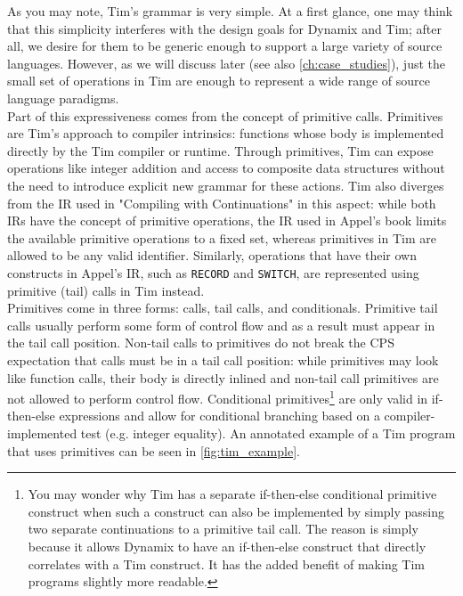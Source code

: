 As you may note, Tim's grammar is very simple. At a first glance, one may think that this simplicity interferes with the design goals for Dynamix and Tim; after all, we desire for them to be generic enough to support a large variety of source languages. However, as we will discuss later (see also \cref{ch:case_studies}), just the small set of operations in Tim are enough to represent a wide range of source language paradigms.\\

Part of this expressiveness comes from the concept of primitive calls. Primitives are Tim's approach to compiler intrinsics: functions whose body is implemented directly by the Tim compiler or runtime. Through primitives, Tim can expose operations like integer addition and access to composite data structures without the need to introduce explicit new grammar for these actions. Tim also diverges from the \ac{IR} used in "Compiling with Continuations" in this aspect: while both \acp{IR} have the concept of primitive operations, the \ac{IR} used in Appel's book limits the available primitive operations to a fixed set, whereas primitives in Tim are allowed to be any valid identifier. Similarly, operations that have their own constructs in Appel's \ac{IR}, such as \texttt{RECORD} and \texttt{SWITCH}, are represented using primitive (tail) calls in Tim instead.\\

Primitives come in three forms: calls, tail calls, and conditionals. Primitive tail calls usually perform some form of control flow and as a result must appear in the tail call position. Non-tail calls to primitives do not break the \ac{CPS} expectation that calls must be in a tail call position: while primitives may look like function calls, their body is directly inlined and non-tail call primitives are not allowed to perform control flow. Conditional primitives\footnote{You may wonder why Tim has a separate if-then-else conditional primitive construct when such a construct can also be implemented by simply passing two separate continuations to a primitive tail call. The reason is simply because it allows Dynamix to have an if-then-else construct that directly correlates with a Tim construct. It has the added benefit of making Tim programs slightly more readable.} are only valid in if-then-else expressions and allow for conditional branching based on a compiler-implemented test (e.g. integer equality). An annotated example of a Tim program that uses primitives can be seen in \cref{fig:tim_example}. \\

